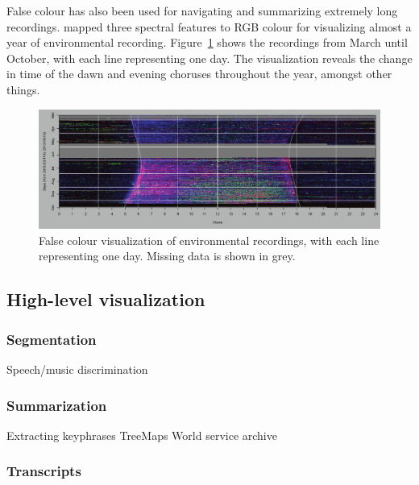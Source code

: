 
False colour has also been used for navigating and summarizing extremely long recordings. \citet{Towsey2014} mapped
three spectral features to RGB colour for visualizing almost a year of environmental recording.
Figure~\ref{fig:towsey} shows the recordings from March until October, with each line representing one day.  The
visualization reveals the change in time of the dawn and evening choruses throughout the year, amongst other things.

\begin{figure}[p]
  \centering
  \includegraphics[width=0.95\linewidth]{figs/towsey.png}
  \caption{False colour visualization of environmental recordings, with each line representing one day. Missing data is
    shown in grey.
    \citep{Towsey2014}}
  \label{fig:towsey}
\end{figure}

\subsection{High-level visualization}

\subsubsection{Segmentation}

Speech/music discrimination \citep{Wieser2014}

\subsubsection{Summarization}

Extracting keyphrases \citep{Inkpen2004}
TreeMaps \citep{Abdulhamid2013a}
World service archive \citep{Raimond2014}

\subsubsection{Transcripts}\label{sec:background-transcripts}

